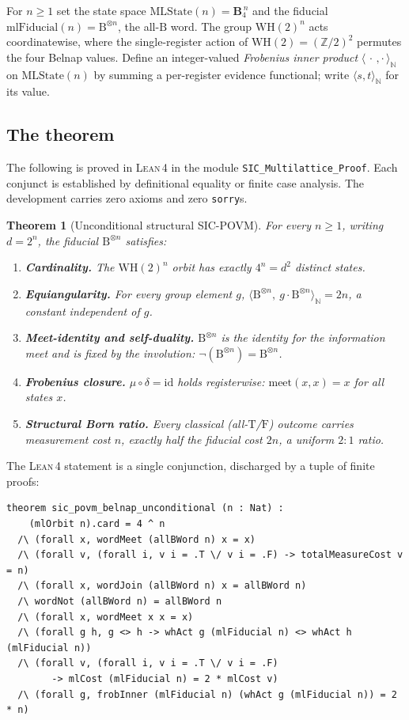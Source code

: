 \documentclass[12pt,a4paper]{article}
\newtheorem{theorem}{Theorem}[section]
\newcommand{\BFour}{\mathbf{B}_4}
\newcommand{\WH}{\mathrm{WH}}
\newcommand{\frob}{\mu \circ \delta = \mathrm{id}}
\newcommand{\Lean}{\textsc{Lean\,4}}
\newcommand{\frobInner}{\langle\,\cdot\,,\cdot\,\rangle_{\!\mathbb{N}}}
\begin{document}
For $n \geq 1$ set the state space $\mathrm{MLState}(n) = \BFour^{\,n}$ and the
fiducial $\mathrm{mlFiducial}(n) = \mathrm{B}^{\otimes n}$, the all-$\mathrm{B}$
word. The group $\WH(2)^n$ acts coordinatewise, where the single-register
action of $\WH(2) = (\mathbb{Z}/2)^2$ permutes the four Belnap values. Define
an integer-valued \emph{Frobenius inner product}
$\frobInner$ on $\mathrm{MLState}(n)$ by summing a per-register evidence
functional; write $\langle s, t\rangle_{\mathbb{N}}$ for its value.

\subsection{The theorem}

The following is proved in \Lean{} in the module
\texttt{SIC\_Multilattice\_Proof}. Each conjunct is established by definitional
equality or finite case analysis. The development carries zero axioms and zero
\texttt{sorry}s.

\begin{theorem}[Unconditional structural SIC-POVM]
\label{thm:unconditional}
For every $n \geq 1$, writing $d = 2^n$, the fiducial $\mathrm{B}^{\otimes n}$
satisfies:
\begin{enumerate}
\item \textbf{Cardinality.} The $\WH(2)^n$ orbit has exactly $4^n = d^2$
distinct states.
\item \textbf{Equiangularity.} For every group element $g$,
$\langle \mathrm{B}^{\otimes n},\ g\cdot \mathrm{B}^{\otimes n}\rangle_{\mathbb{N}}
= 2n$, a constant independent of $g$.
\item \textbf{Meet-identity and self-duality.}
$\mathrm{B}^{\otimes n}$ is the identity for the information meet and is fixed
by the involution: $\neg(\mathrm{B}^{\otimes n}) = \mathrm{B}^{\otimes n}$.
\item \textbf{Frobenius closure.} $\frob$ holds registerwise:
$\mathrm{meet}(x,x) = x$ for all states $x$.
\item \textbf{Structural Born ratio.} Every classical (all-$\mathrm{T}$/$\mathrm{F}$)
outcome carries measurement cost $n$, exactly half the fiducial cost $2n$, a
uniform $2\!:\!1$ ratio.
\end{enumerate}
\end{theorem}

The \Lean{} statement is a single conjunction, discharged by a tuple of
finite proofs:

\begin{lstlisting}
theorem sic_povm_belnap_unconditional (n : Nat) :
    (mlOrbit n).card = 4 ^ n
  /\ (forall x, wordMeet (allBWord n) x = x)
  /\ (forall v, (forall i, v i = .T \/ v i = .F) -> totalMeasureCost v = n)
  /\ (forall x, wordJoin (allBWord n) x = allBWord n)
  /\ wordNot (allBWord n) = allBWord n
  /\ (forall x, wordMeet x x = x)
  /\ (forall g h, g <> h -> whAct g (mlFiducial n) <> whAct h (mlFiducial n))
  /\ (forall v, (forall i, v i = .T \/ v i = .F)
        -> mlCost (mlFiducial n) = 2 * mlCost v)
  /\ (forall g, frobInner (mlFiducial n) (whAct g (mlFiducial n)) = 2 * n)
\end{lstlisting}
\end{document}
